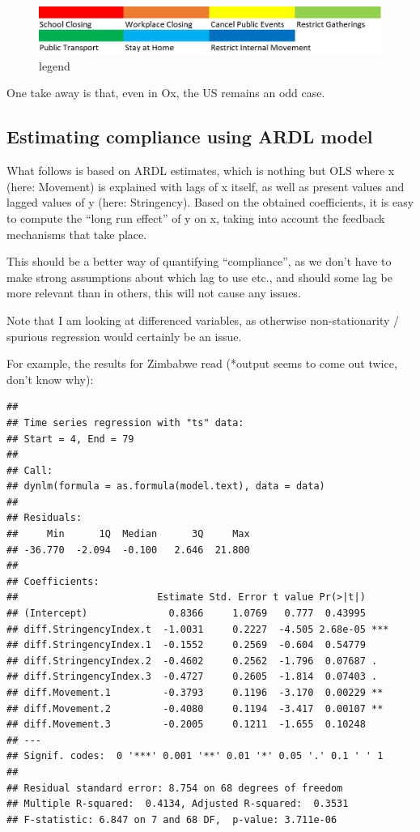 \documentclass[
  english,
  ,doc,floatsintext]{apa6}
\begin{document}
\begin{figure}
\centering
\includegraphics{legend_improvised.PNG}
\caption{legend}
\end{figure}

One take away is that, even in Ox, the US remains an odd case.

\hypertarget{estimating-compliance-using-ardl-model}{%
\subsection{Estimating compliance using ARDL model}\label{estimating-compliance-using-ardl-model}}

What follows is based on ARDL estimates, which is nothing but OLS where x (here: Movement) is explained with lags of x itself, as well as present values and lagged values of y (here: Stringency). Based on the obtained coefficients, it is easy to compute the \enquote{long run effect} of y on x, taking into account the feedback mechanisms that take place.

This should be a better way of quantifying \enquote{compliance}, as we don't have to make strong assumptions about which lag to use etc., and should some lag be more relevant than in others, this will not cause any issues.

Note that I am looking at differenced variables, as otherwise non-stationarity / spurious regression would certainly be an issue.

For example, the results for Zimbabwe read (*output seems to come out twice, don't know why):

\begin{verbatim}
## 
## Time series regression with "ts" data:
## Start = 4, End = 79
## 
## Call:
## dynlm(formula = as.formula(model.text), data = data)
## 
## Residuals:
##     Min      1Q  Median      3Q     Max 
## -36.770  -2.094  -0.100   2.646  21.800 
## 
## Coefficients:
##                        Estimate Std. Error t value Pr(>|t|)    
## (Intercept)              0.8366     1.0769   0.777  0.43995    
## diff.StringencyIndex.t  -1.0031     0.2227  -4.505 2.68e-05 ***
## diff.StringencyIndex.1  -0.1552     0.2569  -0.604  0.54779    
## diff.StringencyIndex.2  -0.4602     0.2562  -1.796  0.07687 .  
## diff.StringencyIndex.3  -0.4727     0.2605  -1.814  0.07403 .  
## diff.Movement.1         -0.3793     0.1196  -3.170  0.00229 ** 
## diff.Movement.2         -0.4080     0.1194  -3.417  0.00107 ** 
## diff.Movement.3         -0.2005     0.1211  -1.655  0.10248    
## ---
## Signif. codes:  0 '***' 0.001 '**' 0.01 '*' 0.05 '.' 0.1 ' ' 1
## 
## Residual standard error: 8.754 on 68 degrees of freedom
## Multiple R-squared:  0.4134, Adjusted R-squared:  0.3531 
## F-statistic: 6.847 on 7 and 68 DF,  p-value: 3.711e-06
\end{verbatim}
\end{document}
